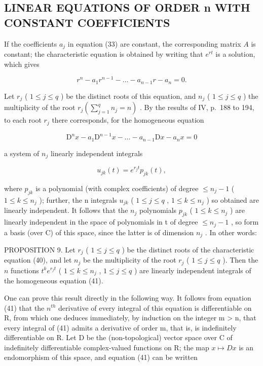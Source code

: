 \subsection{LINEAR EQUATIONS OF ORDER n WITH CONSTANT COEFFICIENTS}

If the coefficients \(a_{j}\) in equation (33) are constant, the corresponding matrix \(A\) is constant; the characteristic equation is obtained by writing that \(e^{rt}\) is a solution, which gives

\[
r ^ {n} - a _ {1} r ^ {n - 1} - \ldots - a _ {n - 1} r - a _ {n} = 0.\tag{40}
\]

Let \(r_j\) ( \(1 \leqslant j \leqslant q\) ) be the distinct roots of this equation, and \(n_j\) ( \(1 \leqslant j \leqslant q\) ) the multiplicity of the root \(r_j \left( \sum_{j=1}^{q} n_j = n \right)\) . By the results of IV, p.~188 to 194, to each root \(r_j\) there corresponds, for the homogeneous equation

\[
\mathrm{D} ^ {n} x - a _ {1} \mathrm{D} ^ {n - 1} x - \dots - a _ {n - 1} \mathrm{D} x - a _ {n} x = 0\tag{41}
\]

a system of \(n_j\) linearly independent integrals

\[
u _ {j k} (t) = e ^ {r _ {j} t} p _ {j k} (t),
\]

where \(p_{jk}\) is a polynomial (with complex coefficients) of degree \(\leqslant n_{j}-1\) ( \(1\leqslant k\leqslant n_{j}\) ); further, the n integrals \(u_{jk}\) ( \(1\leqslant j\leqslant q\) , \(1\leqslant k\leqslant n_{j}\) ) so obtained are linearly independent. It follows that the \(n_{j}\) polynomials \(p_{jk}\) ( \(1\leqslant k\leqslant n_{j}\) ) are linearly independent in the space of polynomials in t of degree \(\leqslant n_{j}-1\) , so form a basis (over C) of this space, since the latter is of dimension \(n_{j}\) . In other words:

PROPOSITION 9. Let \(r_j\) ( \(1 \leqslant j \leqslant q\) ) be the distinct roots of the characteristic equation (40), and let \(n_j\) be the multiplicity of the root \(r_j\) ( \(1 \leqslant j \leqslant q\) ). Then the \(n\) functions \(t^k e^{r_j t}\) ( \(1 \leqslant k \leqslant n_j\) , \(1 \leqslant j \leqslant q\) ) are linearly independent integrals of the homogeneous equation (41).

One can prove this result directly in the following way. It follows from equation (41) that the \(n^{th}\) derivative of every integral of this equation is differentiable on R, from which one deduces immediately, by induction on the integer m \textgreater{} n, that every integral of (41) admits a derivative of order m, that is, is indefinitely differentiable on R. Let D be the (non-topological) vector space over C of indefinitely differentiable complex-valued functions on R; the map \(x \mapsto Dx\) is an endomorphism of this space, and equation (41) can be written

